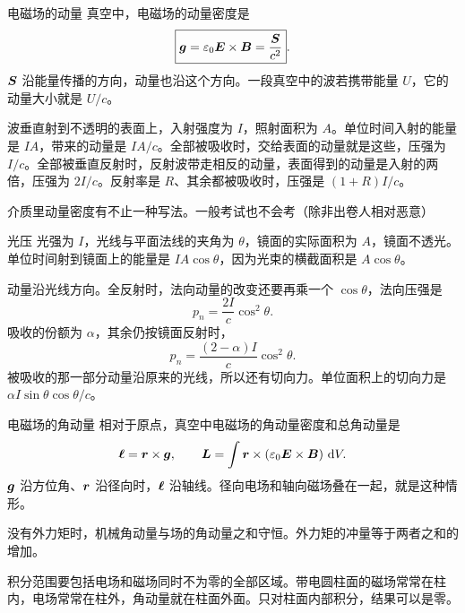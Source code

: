 \begin{frame}{电磁场的动量}
真空中，电磁场的动量密度是
\[
 \boxed{\bm{g}=\varepsilon_0\bm{E}\times\bm{B}=\frac{\bm{S}}{c^2}}.
\]
$\bm{S}$ 沿能量传播的方向，动量也沿这个方向。一段真空中的波若携带能量 $U$，它的动量大小就是 $U/c$。

波垂直射到不透明的表面上，入射强度为 $I$，照射面积为 $A$。单位时间入射的能量是 $IA$，带来的动量是 $IA/c$。全部被吸收时，交给表面的动量就是这些，压强为 $I/c$。全部被垂直反射时，反射波带走相反的动量，表面得到的动量是入射的两倍，压强为 $2I/c$。反射率是 $R$、其余都被吸收时，压强是 $(1+R)I/c$。

介质里动量密度有不止一种写法。一般考试也不会考（除非出卷人相对恶意）
\end{frame}

\begin{frame}{光压}
光强为 $I$，光线与平面法线的夹角为 $\theta$，镜面的实际面积为 $A$，镜面不透光。单位时间射到镜面上的能量是 $IA\cos\theta$，因为光束的横截面积是 $A\cos\theta$。

动量沿光线方向。全反射时，法向动量的改变还要再乘一个 $\cos\theta$，法向压强是
\[
 \boxed{p_n=\frac{2I}{c}\cos^2\theta}.
\]
吸收的份额为 $\alpha$，其余仍按镜面反射时，
\[
 p_n=\frac{(2-\alpha)I}{c}\cos^2\theta.
\]
被吸收的那一部分动量沿原来的光线，所以还有切向力。单位面积上的切向力是 $\alpha I\sin\theta\cos\theta/c$。

\end{frame}

\begin{frame}{电磁场的角动量}
相对于原点，真空中电磁场的角动量密度和总角动量是
\[
 \bm{\ell}=\bm{r}\times\bm{g},
 \qquad
 \bm{L}=\int\bm{r}\times(\varepsilon_0\bm{E}\times\bm{B})\,\mathop{}\!\mathrm d V.
\]
$\bm{g}$ 沿方位角、$\bm{r}$ 沿径向时，$\bm{\ell}$ 沿轴线。径向电场和轴向磁场叠在一起，就是这种情形。

没有外力矩时，机械角动量与场的角动量之和守恒。外力矩的冲量等于两者之和的增加。

积分范围要包括电场和磁场同时不为零的全部区域。带电圆柱面的磁场常常在柱内，电场常常在柱外，角动量就在柱面外面。只对柱面内部积分，结果可以是零。
\end{frame}

